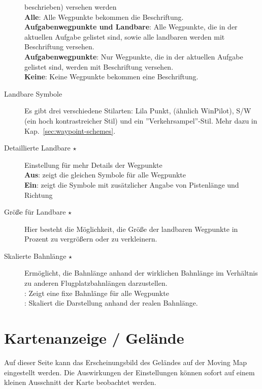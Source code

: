 \begin{description}
   beschrieben)  versehen werden \\
   {\bf Alle}: Alle Wegpunkte bekommen die Beschriftung. \\
   {\bf Aufgabenwegpunkte und Landbare}: Alle Wegpunkte, die in der aktuellen Aufgabe gelistet sind,
   sowie alle landbaren werden mit Beschriftung versehen. \\
   {\bf Aufgabenwegpunkte}:  Nur Wegpunkte, die in der aktuellen Aufgabe gelistet sind, werden
   mit Beschriftung versehen. \\
   {\bf Keine}:  Keine Wegpunkte bekommen eine Beschriftung.
\item[Landbare Symbole]  \label{conf:waypointicons} Es gibt drei verschiedene Stilarten:
   Lila Punkt, (ähnlich WinPilot), S/W (ein hoch kontrastreicher Stil) und ein ''Verkehrsampel''-Stil.
   Mehr dazu in Kap.~\ref{sec:waypoint-schemes}.
\item[Detaillierte Landbare $\star$]  Einstellung für mehr Details der Wegpunkte\\
  {\bf Aus}: zeigt die gleichen Symbole für alle Wegpunkte\\
  {\bf Ein}: zeigt die Symbole mit zusätzlicher Angabe von Pistenlänge und Richtung
\item[Größe für Landbare $\star$]  Hier besteht die Möglichkeit, die Größe der landbaren    Wegpunkte in Prozent zu vergrößern oder zu verkleinern.
\item[Skalierte Bahnlänge $\star$] Ermöglicht, die Bahnlänge anhand der wirklichen Bahnlänge im Verhältnis zu anderen
   Flugplatzbahnlängen darzustellen.\\
{\bf }: Zeigt eine fixe Bahnlänge für alle Wegpunkte\\
{\bf}: Skaliert die Darstellung anhand der realen Bahnlänge.\\

\end{description}
\section{Kartenanzeige / Gelände}\label{sec:terrain-display}
Auf dieser Seite kann das Erscheinungsbild des Geländes auf der Moving Map eingestellt werden.
Die Auswirkungen der Einstellungen können sofort auf einem kleinen Ausschnitt  
der Karte beobachtet werden.

